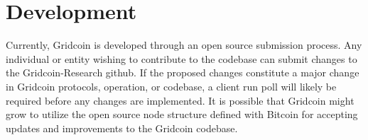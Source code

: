 \section{Development}

\label{sec:dev}

Currently, Gridcoin is developed through an open source submission process.  Any individual or entity wishing to contribute to the codebase can submit changes to the Gridcoin-Research github.  If the proposed changes constitute a major change in Gridcoin protocols, operation, or codebase, a client run poll will likely be required before any changes are implemented.  It is possible that Gridcoin might grow to utilize the open source node structure defined with Bitcoin for accepting updates and improvements to the Gridcoin codebase.